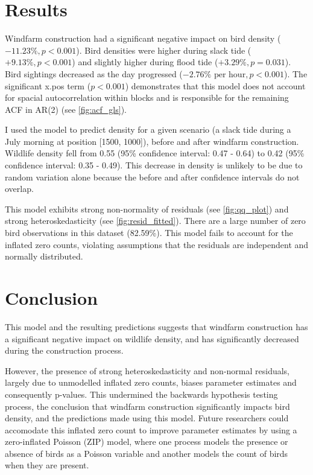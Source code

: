 \documentclass[11pt]{article}
\begin{document}
\vspace{-0.4cm}
\section*{Results}
\vspace{-0.35cm}
Windfarm construction had a significant negative impact on bird density ($-11.23\%, p<0.001$). Bird densities were higher during slack tide ($+9.13\%, p<0.001$) and slightly higher during flood tide ($+3.29\%, p=0.031$). Bird sightings decreased as the day progressed ($-2.76\%$ $\text{per hour}, p<0.001$). The significant x.pos term ($p<0.001$) demonstrates that this model does not account for spacial autocorrelation within blocks and is responsible for the remaining ACF in AR(2) (see \ref{fig:acf_gls}).

I used the model to predict density for a given scenario (a slack tide during a July morning at position [1500, 1000]), before and after windfarm construction. Wildlife density fell from 0.55 (95\% confidence interval: 0.47 - 0.64) to 0.42 (95\% confidence interval: 0.35 - 0.49). This decrease in density is unlikely to be due to random variation alone because the before and after confidence intervals do not overlap. 
 
This model exhibits strong non-normality of residuals (see \ref{fig:qq_plot}) and strong heteroskedasticity (see \ref{fig:resid_fitted}). There are a large number of zero bird observations in this dataset (82.59\%). This model fails to account for the inflated zero counts, violating assumptions that the residuals are independent and normally distributed.  

\vspace{-0.4cm}
\section*{Conclusion}
\vspace{-0.35cm}
This model and the resulting predictions suggests that windfarm construction has a significant negative impact on wildlife density, and has significantly decreased during the construction process. 

However, the presence of strong heteroskedasticity and non-normal residuals, largely due to unmodelled inflated zero counts, biases parameter estimates and consequently p-values. This undermined the backwards hypothesis testing process, the conclusion that windfarm construction significantly impacts bird density, and the predictions made using this model. Future researchers could accomodate this inflated zero count to improve parameter estimates by using a zero-inflated Poisson (ZIP) model, where one process models the presence or absence of birds as a Poisson variable and another models the count of birds when they are present.
 
\end{document}
